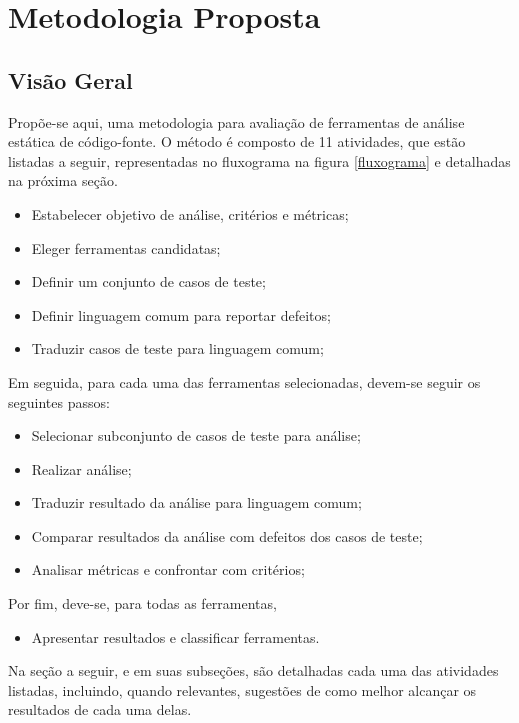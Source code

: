 \chapter{Metodologia Proposta}\label{metodologia_proposta}

\section{Visão Geral}\label{metodologia_proposta:visao_geral}

Propõe-se aqui, uma metodologia para avaliação de ferramentas de análise estática de código-fonte. O método é composto de 11 atividades, que estão listadas a seguir, representadas no fluxograma na figura \ref{fluxograma} e detalhadas na próxima seção.
\begin{itemize}
  \item Estabelecer objetivo de análise, critérios e métricas;
  \item Eleger ferramentas candidatas;
  \item Definir um conjunto de casos de teste;
  \item Definir linguagem comum para reportar defeitos;
  \item Traduzir casos de teste para linguagem comum;
\end{itemize}
Em seguida, para cada uma das ferramentas selecionadas, devem-se seguir os seguintes passos:
\begin{itemize}
  \item Selecionar subconjunto de casos de teste para análise;
  \item Realizar análise;
  \item Traduzir resultado da análise para linguagem comum;
  \item Comparar resultados da análise com defeitos dos casos de  teste;
  \item Analisar métricas e confrontar com critérios;
\end{itemize}
Por fim, deve-se, para todas as ferramentas,
\begin{itemize}
  \item Apresentar resultados e classificar ferramentas.
\end{itemize}



Na seção a seguir,  e em suas subseções, são detalhadas cada uma das atividades listadas, incluindo, quando relevantes, sugestões de como melhor alcançar os resultados de cada uma delas.


